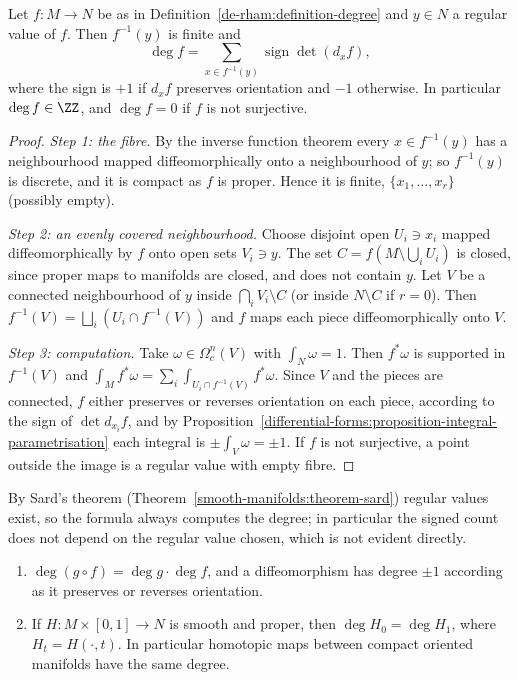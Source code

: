 \begin{theorem}\label{de-rham:theorem-degree-local}
Let $f \colon M \to N$ be as in Definition~\ref{de-rham:definition-degree} and $y \in N$ a regular value of $f$. Then $f^{-1}(y)$ is finite and
\[
\deg f = \sum_{x \in f^{-1}(y)}\operatorname{sign}\det(d_xf),
\]
where the sign is $+1$ if $d_xf$ preserves orientation and $-1$ otherwise. In particular $\deg f \in \ZZ$, and $\deg f = 0$ if $f$ is not surjective.
\end{theorem}

\begin{proof}
\emph{Step 1: the fibre.} By the inverse function theorem every $x \in f^{-1}(y)$ has a neighbourhood mapped diffeomorphically onto a neighbourhood of $y$; so $f^{-1}(y)$ is discrete, and it is compact as $f$ is proper. Hence it is finite,
$\{x_1, \ldots, x_r\}$ (possibly empty).

\emph{Step 2: an evenly covered neighbourhood.} Choose disjoint open $U_i \ni x_i$ mapped diffeomorphically by $f$ onto open sets $V_i \ni y$. The set $C = f(M \setminus \bigcup_iU_i)$ is closed, since proper maps to manifolds are closed, and does not
contain $y$. Let $V$ be a connected neighbourhood of $y$ inside $\bigcap_iV_i \setminus C$ (or inside $N \setminus C$ if $r = 0$). Then $f^{-1}(V) = \bigsqcup_i(U_i \cap f^{-1}(V))$ and $f$ maps each piece diffeomorphically onto $V$.

\emph{Step 3: computation.} Take $\omega \in \Omega^n_c(V)$ with $\int_N\omega = 1$. Then $f^*\omega$ is supported in $f^{-1}(V)$ and $\int_Mf^*\omega = \sum_i\int_{U_i \cap f^{-1}(V)}f^*\omega$. Since $V$ and the pieces are connected, $f$ either
preserves or reverses orientation on each piece, according to the sign of $\det d_{x_i}f$, and by Proposition~\ref{differential-forms:proposition-integral-parametrisation} each integral is $\pm\int_V\omega = \pm1$. If $f$ is not surjective, a point
outside the image is a regular value with empty fibre.
\end{proof}

By Sard's theorem (Theorem~\ref{smooth-manifolds:theorem-sard}) regular values exist, so the formula always computes the degree; in particular the signed count does not depend on the regular value chosen, which is not evident
directly.

\begin{proposition}\label{de-rham:proposition-degree-properties}
\begin{enumerate}
\item $\deg(g \circ f) = \deg g \cdot \deg f$, and a diffeomorphism has degree $\pm1$ according as it preserves or reverses orientation.
\item If $H \colon M \times [0, 1] \to N$ is smooth and proper, then $\deg H_0 = \deg H_1$, where $H_t = H(\cdot, t)$. In particular homotopic maps between compact oriented manifolds have the same degree.
\end{enumerate}
\end{proposition}

